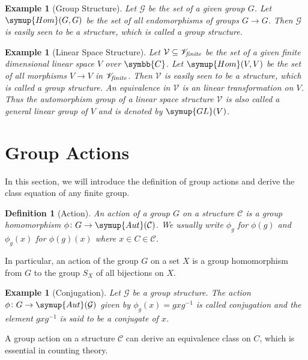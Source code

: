 \documentclass{assignment}[2019/10/15]
\theoremstyle{plain}
\newtheorem{definition}[theorem]{Definition}
\newtheorem{example}[theorem]{Example}
\newcommand{\BC}{\symbb{C}}
\newcommand{\Hom}{\mathop{}\!\symup{Hom}}
\newcommand{\Aut}{\mathop{}\!\symup{Aut}}
\newcommand{\GL}{\mathop{}\!\symup{GL}}
\begin{document}
    \begin{example}[Group Structure]
        Let $\mathcal{G}$ be the set of a given group $G$. Let $\Hom(G, G)$ be the set of all endomorphisms of groups $G\to G$. Then $\mathcal{G}$ is easily seen to be a structure, which is called a \emph{group structure}.
    \end{example}

    \begin{example}[Linear Space Structure]
        Let $\mathcal{V}\subseteq \mathscr{V}_{\text{\it finite}}$ be the set of a given finite dimensional linear space $V$ over $\BC$. Let $\Hom(V, V)$ be the set of all morphisms $V\to V$ in $\mathscr{V}_{\text{\it finite}}$. Then $\mathcal{V}$ is easily seen to be a structure, which is called a \emph{group structure}. An equivalence in $\mathcal{V}$ is an linear transformation on $V$. Thus the automorphism group of a linear space structure $\mathcal{V}$ is also called a \emph{general linear group} of $V$ and is denoted by $\GL(V)$.
    \end{example}

    \section{Group Actions}

    In this section, we will introduce the definition of group actions and derive the class equation of any finite group.

    \begin{definition}[Action]
        An \emph{action} of a group $G$ on a structure $\mathcal{C}$ is a group homomorphism $\phi\colon G\to \Aut(\mathcal{C})$. We usually write $\phi_g$ for $\phi(g)$ and $\phi_g(x)$ for $\phi(g)(x)$ where $x\in C\in \mathcal{C}$.
    \end{definition}

    In particular, an action of the group $G$ on a set $X$ is a group homomorphism from $G$ to the group $S_X$ of all bijections on $X$.

    \begin{example}[Conjugation]
        Let $\mathcal{G}$ be a group structure. The action $\phi\colon G\to \Aut(\mathcal{G})$ given by $\phi_g(x) = gxg^{-1}$ is called \emph{conjugation} and the element $gxg^{-1}$ is said to be a \emph{conjugate} of $x$.
    \end{example}

    A group action on a structure $\mathcal{C}$ can derive an equivalence class on $C$, which is essential in counting theory.
\end{document}
